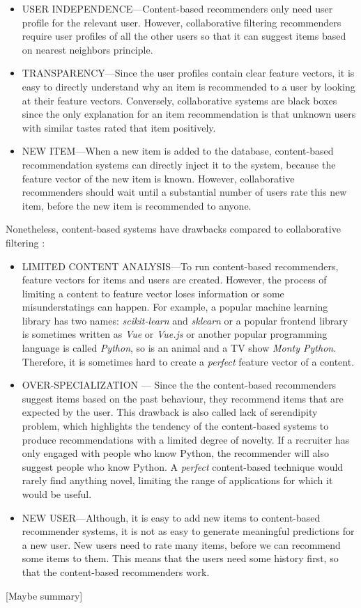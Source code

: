 \begin{itemize}
	\item USER INDEPENDENCE—Content-based recommenders only need user profile for the relevant user. However, collaborative filtering recommenders require user profiles of all the other users so that it can suggest items based on nearest neighbors principle.
	\item TRANSPARENCY—Since the user profiles contain clear feature vectors, it is easy to directly understand why an item is recommended to a user by looking at their feature vectors. Conversely, collaborative systems are black boxes since the only explanation for an item recommendation is that unknown users with similar tastes rated that item positively.
	\item NEW ITEM—When a new item is added to the database, content-based recommendation systems can directly inject it to the system, because the feature vector of the new item is known. However, collaborative recommenders should wait until a substantial number of users rate this new item, before the new item is recommended to anyone.
\end{itemize}

Nonetheless, content-based systems have drawbacks compared to collaborative filtering  \cite{de2015semantics}: 

\begin{itemize}
	\item LIMITED CONTENT ANALYSIS—To run content-based recommenders, feature vectors for items and users are created. However, the process of limiting a content to feature vector loses information or some misunderstatings can happen. For example, a popular machine learning library has two names: \textit{scikit-learn} and \textit{sklearn} or a popular frontend library is sometimes written as \textit{Vue} or \textit{Vue.js} or another popular programming language is called \textit{Python}, so is an animal and a TV show \textit{Monty Python}. Therefore, it is sometimes hard to create a \textit{perfect} feature vector of a content.
	\item OVER-SPECIALIZATION — Since the the content-based recommenders suggest items based on the past behaviour, they recommend items that are expected by the user. This drawback is also called lack of serendipity problem, which highlights the tendency of the content-based systems to produce recommendations with a limited degree of novelty. If a recruiter has only engaged with people who know Python, the recommender will also suggest people who know Python. A \textit{perfect} content-based technique would rarely find anything novel, limiting the range of applications for which it would be useful.
	\item NEW USER—Although, it is easy to add new items to content-based recommender systems, it is not as easy to generate meaningful predictions for a new user. New users need to rate many items, before we can recommend some items to them. This means that the users need some history first, so that the content-based recommenders work.
\end{itemize}

[Maybe summary]



